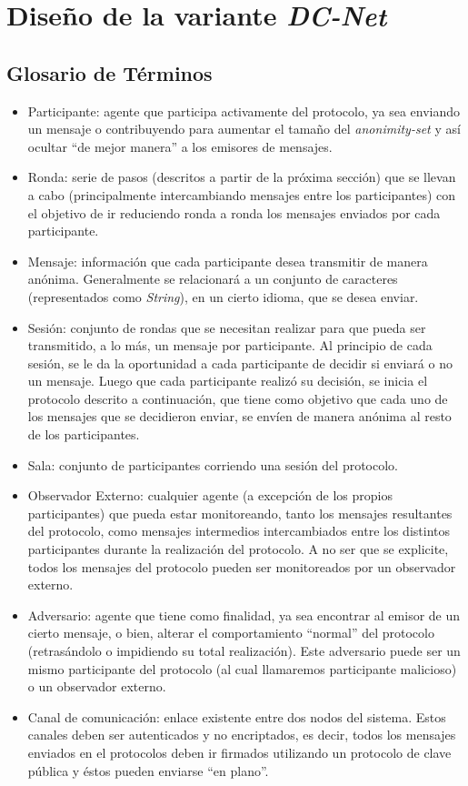 \chapter{Diseño de la variante \emph{DC-Net}}

\section{Glosario de Términos}

\begin{itemize}
    \item Participante: agente que participa activamente del protocolo, ya sea 
    enviando un mensaje o contribuyendo para aumentar el tamaño del 
    \emph{anonimity-set} y así ocultar ``de mejor manera'' a los emisores de 
    mensajes. 
    \item Ronda: serie de pasos (descritos a partir de la próxima sección) que 
    se llevan a cabo (principalmente intercambiando mensajes entre los 
    participantes) con el objetivo de ir reduciendo ronda a ronda los mensajes 
    enviados por cada participante.  
    \item Mensaje: información que cada participante desea transmitir de 
    manera anónima. Generalmente se relacionará a un conjunto de caracteres 
    (representados como \emph{String}), en un cierto idioma, que se desea 
    enviar.
    \item Sesión: conjunto de rondas que se necesitan realizar para que pueda 
    ser transmitido, a lo más, un mensaje por participante. Al principio de 
    cada sesión, se le da la oportunidad a cada participante de decidir si 
    enviará o no un mensaje. Luego que cada participante realizó su decisión, 
    se inicia el protocolo descrito a continuación, que tiene como objetivo 
    que cada uno de los mensajes que se decidieron enviar, se envíen de manera 
    anónima al resto de los participantes.
    \item Sala: conjunto de participantes corriendo una sesión del protocolo.
    \item Observador Externo: cualquier agente (a excepción de los propios 
    participantes) que pueda estar monitoreando, tanto los mensajes 
    resultantes del protocolo, como mensajes intermedios intercambiados entre 
    los distintos participantes durante la realización del protocolo. A no ser 
    que se explicite, todos los mensajes del protocolo pueden ser monitoreados 
    por un observador externo.
    \item Adversario: agente que tiene como finalidad, ya sea encontrar al 
    emisor de un cierto mensaje, o bien, alterar el comportamiento ``normal'' 
    del protocolo (retrasándolo o impidiendo su total realización). Este 
    adversario puede ser un mismo participante del protocolo (al cual 
    llamaremos participante malicioso) o un observador externo.
    \item Canal de comunicación: enlace existente entre dos nodos del 
    sistema. Estos canales deben ser autenticados y no encriptados, es decir, todos los mensajes 
    enviados en el protocolos deben ir firmados utilizando un protocolo 
    de clave pública y éstos pueden enviarse ``en plano''.
\end{itemize}

